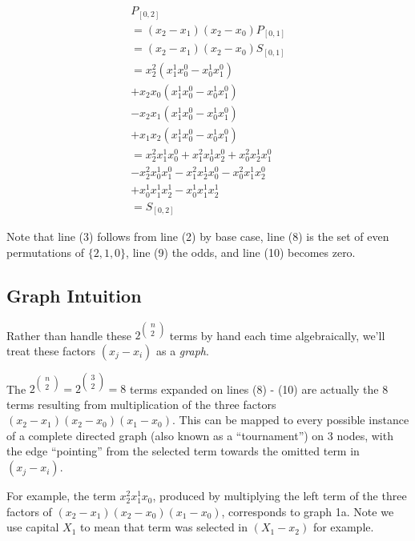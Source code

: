 \documentclass[11pt, oneside]{article} 	%
\begin{document}
\begin{align}
P_{[0,2]}  \\
= (x_2-x_1)(x_2-x_0)P_{[0,1]} \\
= (x_2-x_1)(x_2-x_0)S_{[0,1]} \\
= x_2^2(x_1^1x_0^0 - x_0^1x_1^0) \\
+ x_2x_0(x_1^1x_0^0 - x_0^1x_1^0) \\
- x_2x_1 (x_1^1x_0^0 - x_0^1x_1^0) \\
+ x_1x_2(x_1^1x_0^0 - x_0^1x_1^0)  \\
= x_2^2x_1^1x_0^0  + x_1^2x_0^1x_2^0 + x_0^2x_2^1x_1^0   \\
 - x_2^2x_0^1x_1^0 - x_1^2x_2^1x_0^0 - x_0^2x_1^1x_2^0 \\
+ x_0^1x_1^1x_2^1 - x_0^1x_1^1x_2^1 \\
= S_{[0,2]}
\end{align}

Note that line (3) follows from line (2) by base case, line (8) is the set of even permutations of $\{2,1,0\}$, line (9) the odds, and line (10) becomes zero.

\subsection{Graph Intuition}

Rather than handle these $2^{\begin{pmatrix}n\\2\end{pmatrix}}$ terms by hand each time algebraically, we'll treat these factors $(x_j - x_i)$ as a \emph{graph}.

The $2^{\begin{pmatrix}n\\2\end{pmatrix}} = 2^{\begin{pmatrix}3\\2\end{pmatrix}} = 8$ terms expanded on lines (8) - (10) are actually the 8 terms resulting from multiplication of the three factors $(x_2 - x_1)(x_2-x_0)(x_1-x_0)$.  This can be mapped to every possible instance of a complete directed graph (also known as a ``tournament'') on 3 nodes, with the edge ``pointing'' from the selected term towards the omitted term in $(x_j - x_i)$.

For example, the term $x_2^2x_1^1x_0$, produced by multiplying the left term of the three factors of $(x_2-x_1)(x_2-x_0)(x_1-x_0)$, corresponds to graph 1a.  Note we use capital $X_1$ to mean that term was selected in $(X_1 - x_2)$ for example.
\end{document}
